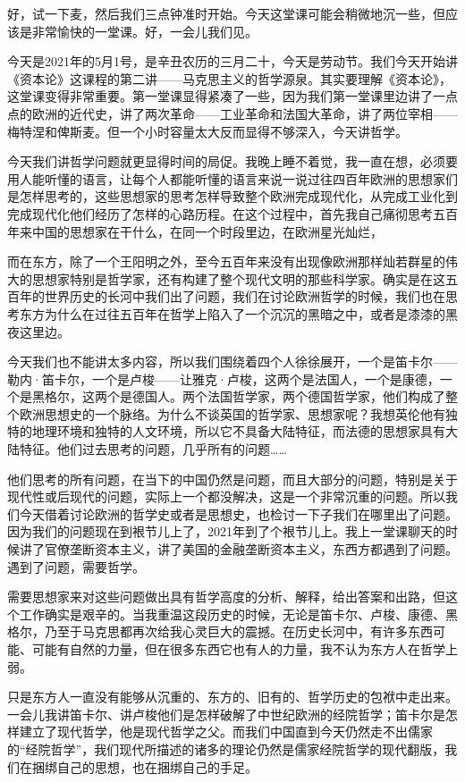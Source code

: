 \documentclass[UTF8, 12pt, a4paper]{ctexrep}
\begin{document}
好，试一下麦，然后我们三点钟准时开始。今天这堂课可能会稍微地沉一些，但应该是非常愉快的一堂课。好，一会儿我们见。

今天是2021年的5月1号，是辛丑农历的三月二十，今天是劳动节。我们今天开始讲《资本论》这课程的第二讲——马克思主义的哲学源泉。其实要理解《资本论》，这堂课变得非常重要。第一堂课显得紧凑了一些，因为我们第一堂课里边讲了一点点的欧洲的近代史，讲了两次革命——工业革命和法国大革命，讲了两位宰相——梅特涅和俾斯麦。但一个小时容量太大反而显得不够深入，今天讲哲学。

今天我们讲哲学问题就更显得时间的局促。我晚上睡不着觉，我一直在想，必须要用人能听懂的语言，让每个人都能听懂的语言来说一说过往四百年欧洲的思想家们是怎样思考的，这些思想家的思考怎样导致整个欧洲完成现代化，从完成工业化到完成现代化他们经历了怎样的心路历程。在这个过程中，首先我自己痛彻思考五百年来中国的思想家在干什么，在同一个时段里边，在欧洲星光灿烂，

而在东方，除了一个王阳明之外，至今五百年来没有出现像欧洲那样灿若群星的伟大的思想家特别是哲学家，还有构建了整个现代文明的那些科学家。确实是在这五百年的世界历史的长河中我们出了问题，我们在讨论欧洲哲学的时候，我们也在思考东方为什么在过往五百年在哲学上陷入了一个沉沉的黑暗之中，或者是漆漆的黑夜这里边。

今天我们也不能讲太多内容，所以我们围绕着四个人徐徐展开，一个是笛卡尔——勒内·笛卡尔，一个是卢梭——让雅克·卢梭，这两个是法国人，一个是康德，一个是黑格尔，这两个是德国人。两个法国哲学家，两个德国哲学家，他们构成了整个欧洲思想史的一个脉络。为什么不谈英国的哲学家、思想家呢？我想英伦他有独特的地理环境和独特的人文环境，所以它不具备大陆特征，而法德的思想家具有大陆特征。他们过去思考的问题，几乎所有的问题……

他们思考的所有问题，在当下的中国仍然是问题，而且大部分的问题，特别是关于现代性或后现代的问题，实际上一个都没解决，这是一个非常沉重的问题。所以我们今天借着讨论欧洲的哲学史或者是思想史，也检讨一下子我们在哪里出了问题。因为我们的问题现在到裉节儿上了，2021年到了个裉节儿上。我上一堂课聊天的时候讲了官僚垄断资本主义，讲了美国的金融垄断资本主义，东西方都遇到了问题。遇到了问题，需要哲学。

需要思想家来对这些问题做出具有哲学高度的分析、解释，给出答案和出路，但这个工作确实是艰辛的。当我重温这段历史的时候，无论是笛卡尔、卢梭、康德、黑格尔，乃至于马克思都再次给我心灵巨大的震撼。在历史长河中，有许多东西可能、可能有自然的力量，但在很多东西它也有人的力量，我不认为东方人在哲学上弱。

只是东方人一直没有能够从沉重的、东方的、旧有的、哲学历史的包袱中走出来。一会儿我讲笛卡尔、讲卢梭他们是怎样破解了中世纪欧洲的经院哲学；笛卡尔是怎样建立了现代哲学，他是现代哲学之父。而我们中国直到今天仍然走不出儒家的“经院哲学”，我们现代所描述的诸多的理论仍然是儒家经院哲学的现代翻版，我们在捆绑自己的思想，也在捆绑自己的手足。
\end{document}
